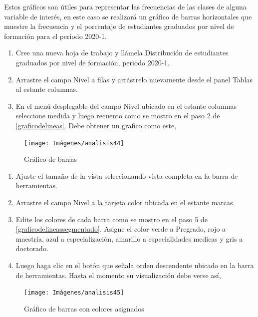 \documentclass[
]{book}
\begin{document}
Estos gráficos son útiles para representar las frecuencias de las clases de alguna variable de interés, en este caso se realizará un gráfico de barras horizontales que muestre la frecuencia y el porcentaje de estudiantes graduados por nivel de formación para el periodo 2020-1.

\begin{enumerate}
\def\labelenumi{\arabic{enumi}.}
\item
  Cree una nueva hoja de trabajo y llámela Distribución de estudiantes graduados por nivel de formación, periodo 2020-1.
\item
  Arrastre el campo Nivel a filas y arrástrelo nuevamente desde el panel Tablas al estante columnas.
\item
  En el menú desplegable del campo Nivel ubicado en el estante columnas seleccione medida y luego recuento como se mostro en el paso 2 de \ref{graficodelineas}. Debe obtener un grafico como este,
\end{enumerate}

\begin{figure}

{\centering \texttt{[image: Imágenes/analisis44]} 

}

\caption{Gráfico de barras}\label{fig:paso3graficobarras-fig}
\end{figure}

\begin{enumerate}
\def\labelenumi{\arabic{enumi}.}
\setcounter{enumi}{3}
\item
  Ajuste el tamaño de la vista seleccionando vista completa en la barra de herramientas.
\item
  Arrastre el campo Nivel a la tarjeta color ubicada en el estante marcas.
\item
  Edite los colores de cada barra como se mostro en el paso 5 de \ref{graficodelineassegmentado}. Asigne el color verde a Pregrado, rojo a maestría, azul a especialización, amarillo a especialidades medicas y gris a doctorado.
\item
  Luego haga clic en el botón que señala orden descendente ubicado en la barra de herramientas. Hasta el momento su visualización debe verse así,
\end{enumerate}

\begin{figure}

{\centering \texttt{[image: Imágenes/analisis45]} 

}

\caption{Gráfico de barras con colores asignados}\label{fig:paso7graficobarras-fig}
\end{figure}
\end{document}

